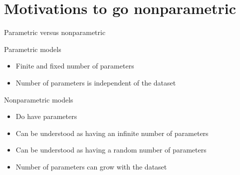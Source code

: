 \section[P vs NP]{Motivations to go nonparametric}

\begin{frame}{Parametric versus nonparametric}
 
\begin{block}{Parametric models}
\begin{itemize}
	\item Finite and fixed number of parameters  
	\item Number of parameters is independent of the dataset
\end{itemize}
\end{block}

\begin{block}{Nonparametric models}
	\begin{itemize}
		\item Do have parameters
		\item Can be understood as having an infinite number of  parameters 
		\item Can be understood as having a random number of  parameters
		\item Number of parameters can grow with the dataset
	\end{itemize}
\end{block}
\end{frame}





